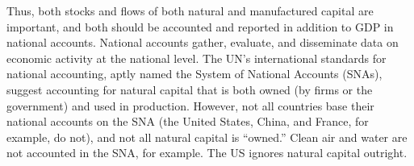 





Thus, both stocks and flows of 
both natural and manufactured capital are important, 
and both should be accounted and reported in addition to GDP 
in national accounts. National
accounts gather, evaluate, 
and disseminate data on economic activity at the national level. 
The UN's international standards for national accounting, aptly named the System
of National Accounts (SNAs), suggest
accounting for natural capital that is both owned 
(by firms or the government) and used in production.
However, not all countries base their national accounts on the SNA 
(the United States, China, and France, for example, do not), 
and not all natural capital is ``owned.'' 
Clean air and water are not accounted in the SNA, for example. 
The US ignores natural capital outright.


